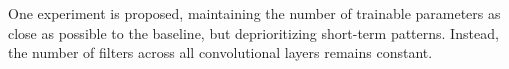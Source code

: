 
One experiment is proposed, maintaining the number of trainable parameters as close as possible to the baseline, but deprioritizing short-term patterns. Instead, the number of filters across all convolutional layers remains constant.

